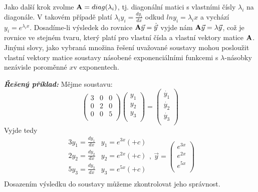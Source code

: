 Jako další krok zvolme ${\bf A} = diag(\lambda_i)$, tj. diagonální matici s vlastními čísly $\lambda_i$ na diagonále. V takovém případě platí $\lambda_i y_i = \frac{dy_i}{dx}$ odkud $ln{y_i} = \lambda_i x$ a vychází $y_i = e^{\lambda_i x}$.\newline
Dosadíme-li výsledek do rovnice ${\bf A}\vec{y} = \dot{\vec{y}}$ vyjde nám ${\bf A}\vec{y} = \lambda\vec{y}$, což je rovnice ve stejném tvaru, který platí pro vlastní čísla a vlastní vektory matice ${\bf A}$. Jinými slovy, jako vybraná množina řešení uvažované soustavy mohou posloužit vlastní vektory matice soustavy násobené exponenciálními funkcemi s $\lambda$-násobky nezávisle poroměnné $x$v exponentech.

{\bf\it Řešený příklad:}\newline
Mějme soustavu:
\[
  \left(
    \begin{array}{ccc}
     3 & 0 & 0\\
     0 & 2 & 0\\
     0 & 0 & 5\\
    \end{array}
  \right) 
  \left(
    \begin{array}{l}
     y_1\\
     y_2\\
     y_3\\
    \end{array}
  \right) = 
  \left(
    \begin{array}{l}
     \dot{y_1}\\
     \dot{y_2}\\
     \dot{y_3}\\
    \end{array}
  \right)
\]
Vyjde tedy
\[
 \begin{array}{cc}
  3y_1 = \frac{dy_1}{dx} & y_1 = e^{3x} (+ c) \\
  2y_2 = \frac{dy_2}{dx} & y_2 = e^{2x} (+ c) \\
  5y_3 = \frac{dy_3}{dx} & y_3 = e^{5x} (+ c) \\
 \end{array},~
 \vec{y} = \left(
    \begin{array}{l}
     e^{3x}\\
     e^{2x}\\
     e^{5x}\\
    \end{array}
  \right)
\]
Dosazením výsledku do soustavy můžeme zkontrolovat jeho správnost.
